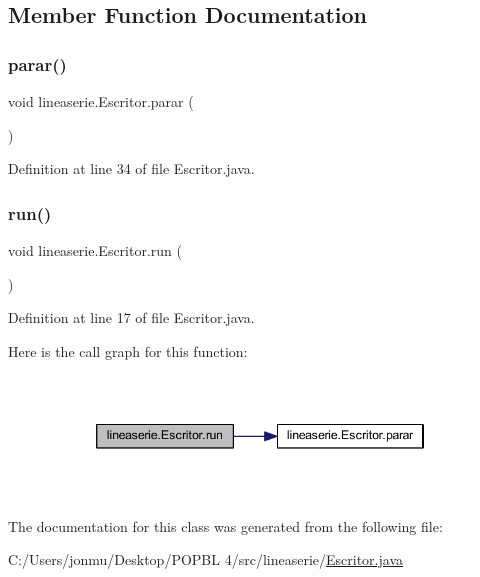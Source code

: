 \subsection{Member Function Documentation}
\mbox{\label{classlineaserie_1_1_escritor_acd4e96fe60f601259643fa12d15b5387}} 
\subsubsection{\texorpdfstring{parar()}{parar()}}
{\footnotesize\ttfamily void lineaserie.\+Escritor.\+parar (\begin{DoxyParamCaption}{ }\end{DoxyParamCaption})}



Definition at line 34 of file Escritor.\+java.

\mbox{\label{classlineaserie_1_1_escritor_a510a437d7f0ed6a89fb326b6d03e4d6c}} 
\subsubsection{\texorpdfstring{run()}{run()}}
{\footnotesize\ttfamily void lineaserie.\+Escritor.\+run (\begin{DoxyParamCaption}{ }\end{DoxyParamCaption})}



Definition at line 17 of file Escritor.\+java.

Here is the call graph for this function\+:
\nopagebreak
\begin{figure}[H]
\begin{center}
\leavevmode
\includegraphics[width=346pt]{classlineaserie_1_1_escritor_a510a437d7f0ed6a89fb326b6d03e4d6c_cgraph}
\end{center}
\end{figure}


The documentation for this class was generated from the following file\+:\begin{DoxyCompactItemize}
\item 
C\+:/\+Users/jonmu/\+Desktop/\+P\+O\+P\+B\+L 4/src/lineaserie/\mbox{\hyperlink{_escritor_8java}{Escritor.\+java}}\end{DoxyCompactItemize}

